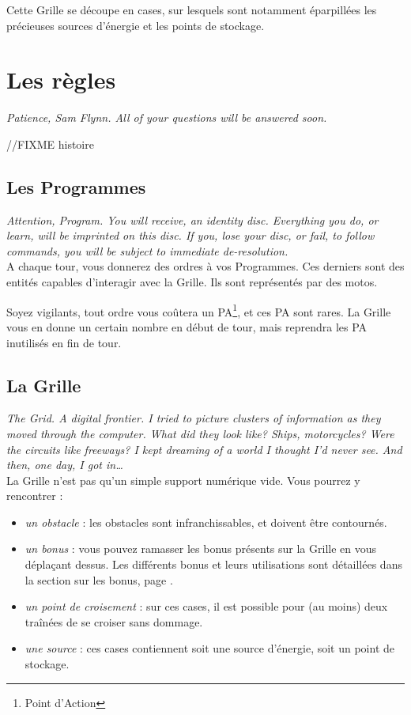 Cette Grille se découpe en cases, sur lesquels sont notamment
éparpillées les précieuses sources d'énergie et les points de stockage.

\newpage
\section{Les règles}
\emph{Patience, Sam Flynn. All of your questions will be answered soon.}

//FIXME histoire

        \subsection{Les Programmes}
        \emph{Attention, Program. You will receive, an identity disc. Everything you do, or learn, will be imprinted on this disc. If you, lose your disc, or fail, to follow commands, you will be subject to immediate de-resolution.}\\

A chaque tour, vous donnerez des ordres à vos Programmes. Ces derniers
sont des entités capables d'interagir avec la Grille. Ils sont
représentés par des motos.

Soyez vigilants, tout ordre vous coûtera un PA\footnote{Point
  d'Action}, et ces PA sont rares. La Grille vous en donne un certain
nombre en début de tour, mais reprendra les PA inutilisés en fin de tour.

\subsection{La Grille}
        \emph{The Grid. A digital frontier. I tried to picture clusters
          of information as they moved through the computer. What did they
          look like? Ships, motorcycles? Were the circuits like freeways? I
          kept dreaming of a world I thought I'd never see. And then, one
          day, I got in\ldots{}}\\

La Grille n'est pas qu'un simple support numérique vide. Vous pourrez
y rencontrer :

\begin{itemize}
  \item \emph{un obstacle} : les obstacles sont infranchissables,
    et doivent être contournés.
  \item \emph{un bonus} : vous pouvez ramasser les bonus présents
    sur la Grille en vous déplaçant dessus. Les différents bonus et
    leurs utilisations sont détaillées dans la section sur les
    bonus, page \pageref{section-bonus}.
  \item \emph{un point de croisement} : sur ces cases, il est
    possible pour (au moins) deux traînées de se croiser sans dommage.
  \item \emph{une source} : ces cases contiennent soit une
    source d'énergie, soit un point de stockage.
\end{itemize}

